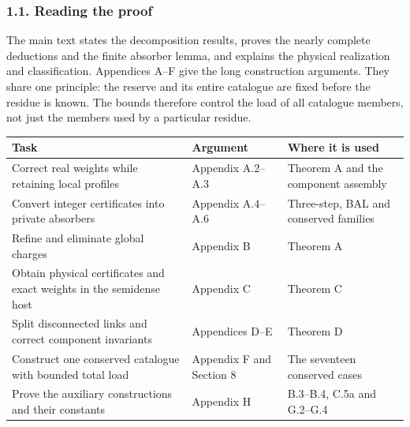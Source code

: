 \documentclass[english,11pt,a4paper]{article}
\begin{document}
\subsubsection{1.1. Reading the proof}\label{reading-the-proof}

The main text states the decomposition results, proves the nearly complete deductions and the finite absorber lemma, and explains the physical realization and classification. Appendices A--F give the long construction arguments. They share one principle: the reserve and its entire catalogue are fixed before the residue is known. The bounds therefore control the load of all catalogue members, not just the members used by a particular residue.

{\begin{longtable}[]{@{}
  >{\raggedright\arraybackslash}p{}
  >{\raggedright\arraybackslash}p{}
  >{\raggedright\arraybackslash}p{}@{}}
\toprule\noalign{}
\begin{minipage}[b]{\linewidth}\raggedright
Task
\end{minipage} & \begin{minipage}[b]{\linewidth}\raggedright
Argument
\end{minipage} & \begin{minipage}[b]{\linewidth}\raggedright
Where it is used
\end{minipage} \\
\midrule\noalign{}
\endhead
\bottomrule\noalign{}
\endlastfoot
Correct real weights while retaining local profiles & Appendix A.2--A.3 & Theorem A and the component assembly \\
Convert integer certificates into private absorbers & Appendix A.4--A.6 & Three-step, BAL and conserved families \\
Refine and eliminate global charges & Appendix B & Theorem A \\
Obtain physical certificates and exact weights in the semidense host & Appendix C & Theorem C \\
Split disconnected links and correct component invariants & Appendices D--E & Theorem D \\
Construct one conserved catalogue with bounded total load & Appendix F and Section 8 & The seventeen conserved cases \\
Prove the auxiliary constructions and their constants & Appendix H & B.3--B.4, C.5a and G.2--G.4 \\
\end{longtable}
}
\end{document}
